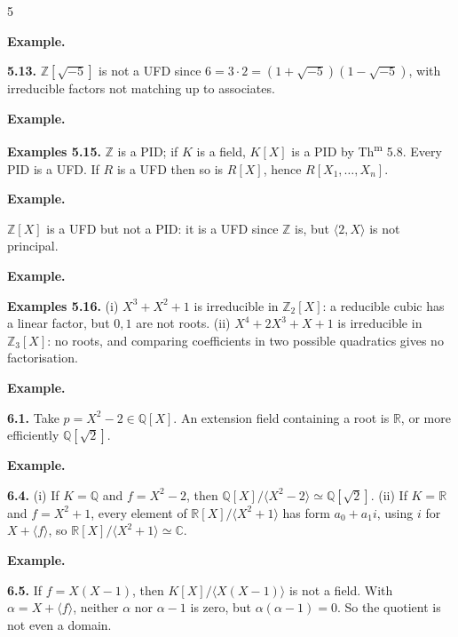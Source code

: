 \documentclass[8pt]{extarticle}
\newenvironment{example}{%
  \begin{tcolorbox}[exampleboxstyle]%
  \textbf{Example.}\ \normalfont
  \ignorespaces
}{%
  \end{tcolorbox}%
}
\begin{document}
\begin{multicols}{5}
        \begin{example}
            \textbf{5.13.} \(\mathbb{Z}[\sqrt{-5}]\) is not a UFD since \(6=3\cdot2=(1+\sqrt{-5})(1-\sqrt{-5})\), with irreducible factors not matching up to associates.
        \end{example}

        \begin{example}
            \textbf{Examples 5.15.}
            \(\mathbb{Z}\) is a PID; if \(K\) is a field, \(K[X]\) is a PID by Th\textsuperscript{m} 5.8. Every PID is a UFD. If \(R\) is a UFD then so is \(R[X]\), hence \(R[X_1,\ldots,X_n]\).
        \end{example}


        \begin{example}
            \(\mathbb{Z}[X]\) is a UFD but not a PID: it is a UFD since \(\mathbb{Z}\) is, but \(\langle2,X\rangle\) is not principal.
        \end{example}

        \begin{example}
            \textbf{Examples 5.16.}
            (i) \(X^3+X^2+1\) is irreducible in \(\mathbb{Z}_2[X]\): a reducible cubic has a linear factor, but \(0,1\) are not roots. (ii) \(X^4+2X^3+X+1\) is irreducible in \(\mathbb{Z}_3[X]\): no roots, and comparing coefficients in two possible quadratics gives no factorisation.
        \end{example}


        \begin{example}
            \textbf{6.1.} Take \(p=X^2-2\in\mathbb{Q}[X]\). An extension field containing a root is \(\mathbb{R}\), or more efficiently \(\mathbb{Q}[\sqrt2]\).
        \end{example}

        \begin{example}
            \textbf{6.4.} (i) If \(K=\mathbb{Q}\) and \(f=X^2-2\), then \(\mathbb{Q}[X]/\langle X^2-2\rangle\simeq\mathbb{Q}[\sqrt2]\). (ii) If \(K=\mathbb{R}\) and \(f=X^2+1\), every element of \(\mathbb{R}[X]/\langle X^2+1\rangle\) has form \(a_0+a_1i\), using \(i\) for \(X+\langle f\rangle\), so \(\mathbb{R}[X]/\langle X^2+1\rangle\simeq\mathbb{C}\).
        \end{example}

        \begin{example}
            \textbf{6.5.} If \(f=X(X-1)\), then \(K[X]/\langle X(X-1)\rangle\) is not a field. With \(\alpha=X+\langle f\rangle\), neither \(\alpha\) nor \(\alpha-1\) is zero, but \(\alpha(\alpha-1)=0\). So the quotient is not even a domain.
        \end{example}


\end{multicols}
\end{document}
